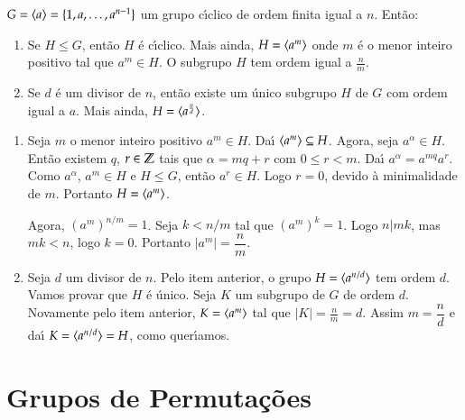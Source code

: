 \begin{proposicao}
	$G = \langle{a}\rangle = \{1, a, \dots, a^{n - 1}\}$ um grupo c{\'\i}clico de ordem finita igual a $n$. Ent\~ao:
	\begin{enumerate}[label=({\roman*})]
		\item Se $H \le G$, ent\~ao $H$ \'e c{\'\i}clico. Mais ainda, $H = \langle{a^m}\rangle$ onde $m$ \'e o menor inteiro positivo tal que $a^m \in H$. O subgrupo $H$ tem ordem igual a $\frac{n}{m}$.

		\item Se $d$ \'e um divisor de $n$, ent\~ao existe um \'unico subgrupo $H$ de $G$ com ordem igual a $a$. Mais ainda, $H = \langle{a^{\frac{n}{d}}}\rangle$.
	\end{enumerate}
\end{proposicao}
\begin{prova}
	\begin{enumerate}[label=({\roman*})]
		\item Seja $m$ o menor inteiro positivo $a^m \in H$. Da{\'\i} $\langle{a^m}\rangle \subseteq H$. Agora, seja $a^\alpha \in H$. Ent\~ao existem $q$, $r \in \mathbb{Z}$ tais que $\alpha = mq + r$ com $0 \le r < m$. Da{\'\i} $a^\alpha = a^{mq}a^r$. Como $a^\alpha$, $a^{m} \in H$ e $H \le G$, ent\~ao $a^r \in H$. Logo $r = 0$, devido \`a minimalidade de $m$. Portanto $H = \langle{a^m}\rangle$.

		Agora, $(a^m)^{n/m} = 1$. Seja $k < n/m$ tal que $(a^m)^k = 1$. Logo $n | mk$, mas $mk < n$, logo $k = 0$. Portanto $|a^m| = \dfrac{n}{m}$.
		\item Seja $d$ um divisor de $n$. Pelo item anterior, o grupo $H = \langle{a^{n/d}}\rangle$ tem ordem $d$. Vamos provar que $H$ \'e \'unico. Seja $K$ um subgrupo de $G$ de ordem $d$. Novamente pelo item anterior, $K = \langle{a^m}\rangle$ tal que $|K| = \frac{n}{m} = d$. Assim $m = \dfrac{n}{d}$ e da{\'\i} $K = \langle{a^{n/d}}\rangle = H$, como quer{\'\i}amos.
	\end{enumerate}
\end{prova}


\section{Grupos de Permuta\c{c}\~oes} %
\label{sec:grupos_de_permutacoes}

